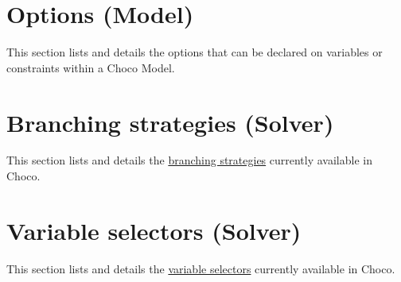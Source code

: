 \chapter{Options (Model)}\label{ch:options}\hypertarget{ch:options}{}
This section lists and details the options that can be declared on variables or constraints within a Choco Model.


\chapter{Branching strategies (Solver)}\label{ch:branchstrat}\hypertarget{ch:branchstrat}{}
This section lists and details the \hyperlink{solver:searchstrategy}{branching strategies} currently available in Choco.













\chapter{Variable selectors (Solver)}\label{ch:varsel}\hypertarget{ch:varsel}{}
This section lists and details the \hyperlink{solver:variableselector}{variable selectors} currently available in Choco.





















